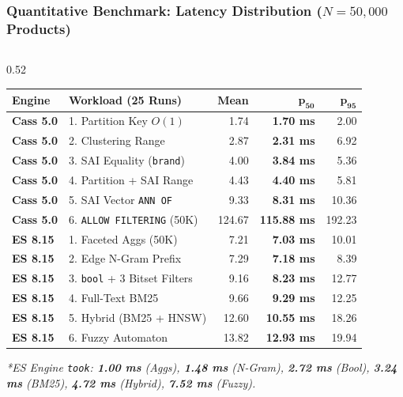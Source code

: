 \documentclass[aspectratio=169]{beamer}
\begin{document}
\begin{frame}
\frametitle{Quantitative Benchmark: Latency Distribution ($N=50,000$ Products)}
\begin{columns}[T]
\begin{column}{0.52\textwidth}
\centering
\tiny
\setlength{\tabcolsep}{2.8pt}
\renewcommand{\arraystretch}{0.98}
\begin{tabular}{llrrr}
\toprule
\textbf{Engine} & \textbf{Workload (25 Runs)} & \textbf{Mean} & $\mathbf{p_{50}}$ & $\mathbf{p_{95}}$ \\
\midrule
\rowcolor{green!8}
\textbf{Cass 5.0} & 1. Partition Key $O(1)$ & 1.74 & \textbf{1.70 ms} & 2.00 \\
\rowcolor{green!8}
\textbf{Cass 5.0} & 2. Clustering Range & 2.87 & \textbf{2.31 ms} & 6.92 \\
\rowcolor{green!8}
\textbf{Cass 5.0} & 3. SAI Equality (\texttt{brand}) & 4.00 & \textbf{3.84 ms} & 5.36 \\
\rowcolor{green!8}
\textbf{Cass 5.0} & 4. Partition + SAI Range & 4.43 & \textbf{4.40 ms} & 5.81 \\
\rowcolor{green!8}
\textbf{Cass 5.0} & 5. SAI Vector \texttt{ANN OF} & 9.33 & \textbf{8.31 ms} & 10.36 \\
\rowcolor{red!12}
\textbf{Cass 5.0} & 6. \texttt{ALLOW FILTERING} (50K) & 124.67 & \textbf{115.88 ms} & 192.23 \\
\midrule
\rowcolor{blue!8}
\textbf{ES 8.15} & 1. Faceted Aggs (50K) & 7.21 & \textbf{7.03 ms} & 10.01 \\
\rowcolor{blue!8}
\textbf{ES 8.15} & 2. Edge N-Gram Prefix & 7.29 & \textbf{7.18 ms} & 8.39 \\
\rowcolor{blue!8}
\textbf{ES 8.15} & 3. \texttt{bool} + 3 Bitset Filters & 9.16 & \textbf{8.23 ms} & 12.77 \\
\rowcolor{blue!8}
\textbf{ES 8.15} & 4. Full-Text BM25 & 9.66 & \textbf{9.29 ms} & 12.25 \\
\rowcolor{blue!8}
\textbf{ES 8.15} & 5. Hybrid (BM25 + HNSW) & 12.60 & \textbf{10.55 ms} & 18.26 \\
\rowcolor{blue!8}
\textbf{ES 8.15} & 6. Fuzzy Automaton & 13.82 & \textbf{12.93 ms} & 19.94 \\
\bottomrule
\end{tabular}
\vspace{0.04cm}
\raggedright
\tiny
\textit{*ES Engine \texttt{took}: \textbf{1.00 ms} (Aggs), \textbf{1.48 ms} (N-Gram), \textbf{2.72 ms} (Bool), \textbf{3.24 ms} (BM25), \textbf{4.72 ms} (Hybrid), \textbf{7.52 ms} (Fuzzy).}

\end{column}
\end{columns}
\end{frame}
\end{document}
